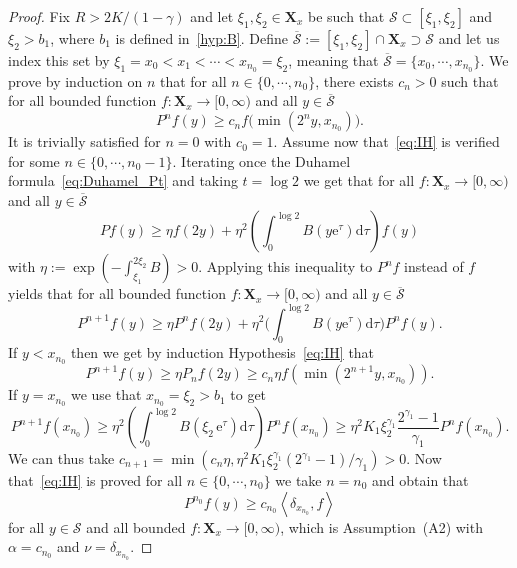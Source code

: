 \documentclass[10pt]{amsart}
\theoremstyle{definition}\newtheorem{defi}[theo]{Definition}\newtheorem{rema}[theo]{Remark}\newtheorem{exam}[theo]{Example}\newtheorem{exem}[theo]{Example}\newtheorem{nota}[theo]{Notation}
\renewcommand{\geq}{\geqslant}
\newcommand{\Scal}{\mathcal{S}}
\newcommand{\1}{\mathds{1}}
\newcommand{\X}{\mathbf{X}}
\newcommand{\e}{\mathrm{e}}
\renewcommand{\d}{\mathrm{d}}
\begin{document}
\begin{proof}
Fix $R>2K/(1-\gamma)$ and let $\xi_1,\xi_2\in\X_x$ be such that $\Scal \subset[\xi_1,\xi_2]$ and $\xi_2> b_1$, where $b_1$ is defined in~\eqref{hyp:B}. Define $\overline{\Scal}:=[\xi_1,\xi_2]\cap\X_x\supset\Scal$ and let us index this set by $\xi_1=x_0<x_1<\cdots<x_{n_0}=\xi_2$, meaning that $\overline{\Scal}=\{x_0,\cdots,x_{n_0}\}$. We prove by induction on $n$ that for all $n\in\{0,\cdots,n_0\}$, there exists $c_n>0$ such that for all bounded function $f:\X_x\to[0,\infty)$ and all $y\in\overline{\Scal}$
\begin{equation}\label{eq:IH}
P^nf(y)\geq c_n f\big(\min\left(2^ny,x_{n_0}\right)\big).
\end{equation}
It is trivially satisfied for $n=0$ with $c_0=1$. Assume now that~\eqref{eq:IH} is verified for some $n\in\{0,\cdots,n_0-1\}$. Iterating once the Duhamel formula~\eqref{eq:Duhamel_Pt} and taking $t=\log2$ we get that for all $f:\X_x\to[0,\infty)$ and all $y\in\overline{\Scal}$
\[
Pf(y)\geq \eta f(2y) + \eta^2\left(\int_0^{\log2} B\left(y\e^\tau\right)\d\tau\right)f(y)
\]
with $\eta:=\exp(-\int_{\xi_1}^{2\xi_2}B)>0$. Applying this inequality to $P^nf$ instead of $f$ yields that for all bounded function $f:\X_x\to[0,\infty)$ and all $y\in\overline{\Scal}$
\[
P^{n+1}f(y)\geq \eta P^nf(2y) + \eta^2\bigg(\int_0^{\log2} B(y\e^\tau)\d\tau\bigg)P^nf(y).
\]
If $y<x_{n_0}$ then we get by induction Hypothesis~\eqref{eq:IH} that
\[
P^{n+1}f(y)\geq \eta P_nf(2y)\geq c_n\eta f\left(\min\left(2^{n+1}y,x_{n_0}\right)\right).
\]
If $y=x_{n_0}$ we use that $x_{n_0}=\xi_2>b_1$ to get
\[
P^{n+1}f\left(x_{n_0}\right)\geq\eta^2\left(\!\int_0^{\log2} B\left(\xi_2\,\e^\tau\right)\d\tau\!\right)P^nf\left(x_{n_0}\right)
\geq\eta^2K_1\xi_2^{\gamma_1}\frac{2^{\gamma_1}-1}{\gamma_1}P^nf\left(x_{n_0}\right).
\]
We can thus take $c_{n+1}=\min(c_n\eta,\eta^2K_1\xi_2^{\gamma_1}(2^{\gamma_1}-1)/\gamma_1)>0$. Now that~\eqref{eq:IH} is proved for all $n\in\{0,\cdots,n_0\}$ we take $n=n_0$ and obtain that
\[
P^{n_0}f(y)\geq c_{n_0}\left\langle\delta_{x_{n_0}},f\right\rangle
\]
for all $y\in\Scal$ and all bounded $f:\X_x\to[0,\infty)$, which is Assumption~(A2) with $\alpha=c_{n_0}$ and $\nu=\delta_{x_{n_0}}$.



\end{proof}
\end{document}
